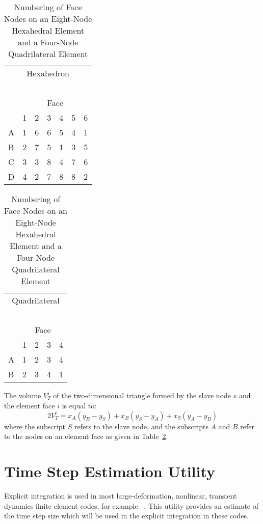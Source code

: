 \begin{table}
\parbox[t]{3.0in}{
\begin{center}
\begin{tabular}{l|cccccc}
\multicolumn{7}{c}{Hexahedron} \\ 
\multicolumn{7}{c}{\ } \\
  & \multicolumn{6}{c}{Face} \\
  & 1 & 2 & 3 & 4 & 5 & 6 \\ \hline
A & 1 & 6 & 6 & 5 & 4 & 1 \\
B & 2 & 7 & 5 & 1 & 3 & 5 \\
C & 3 & 3 & 8 & 4 & 7 & 6 \\
D & 4 & 2 & 7 & 8 & 8 & 2 \\ 
\end{tabular}
\end{center}}\hfil
\parbox[t]{3.0in}{
\begin{center}
\begin{tabular}{l|cccc}
\multicolumn{5}{c}{Quadrilateral} \\ 
\multicolumn{5}{c}{\ } \\
  & \multicolumn{4}{c}{Face} \\
  & 1 & 2 & 3 & 4 \\ \hline
A & 1 & 2 & 3 & 4 \\
B & 2 & 3 & 4 & 1 \\
\end{tabular}
\end{center}}
\caption{Numbering of Face Nodes on an Eight-Node Hexahedral Element and
a Four-Node Quadrilateral Element}\label{t:nodes}
\end{table}

The volume $V_T^i$ of the two-dimensional triangle formed by the
slave node $s$ and the element face $i$ is equal to:
\begin{equation}
2V_T^i = x_A (y_B - y_S) + x_B (y_S - y_A) + x_S (y_A - y_B)
\end{equation}
where the subscript $S$ refers to the slave node, and the subscripts
$A$ and $B$ refer to the nodes on an element face as given in
Table~\ref{t:nodes}.

\section{Time Step Estimation Utility}\label{sec:timestep}

Explicit integration is used in most large-deformation, nonlinear,
transient dynamics finite element codes, for example
~\cite{PRONTO2D,PRONTO3D}. This utility provides an
estimate of the time step size which will be used in the explicit
integration in these codes. 

